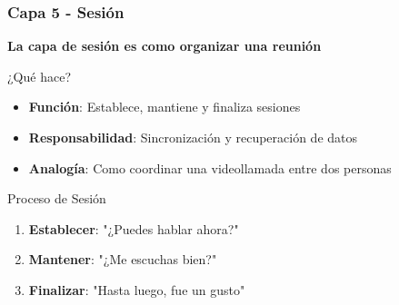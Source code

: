 \documentclass[aspectratio=169]{beamer}
\begin{document}
            \begin{frame}
            \frametitle{Capa 5 - Sesión}
            
            \begin{center}
            \Large \textbf{La capa de sesión es como organizar una reunión}
            \end{center}
        
            \begin{block}{¿Qué hace?}
            \begin{itemize}
            \item \textbf{Función}: Establece, mantiene y finaliza sesiones
            \item \textbf{Responsabilidad}: Sincronización y recuperación de datos
            \item \textbf{Analogía}: Como coordinar una videollamada entre dos personas
            \end{itemize}
            \end{block}
            
            \begin{block}{Proceso de Sesión}
            \begin{enumerate}
            \item \textbf{Establecer}: "¿Puedes hablar ahora?"
            \item \textbf{Mantener}: "¿Me escuchas bien?"
            \item \textbf{Finalizar}: "Hasta luego, fue un gusto"
            \end{enumerate}
            \end{block}
            
          
            \end{frame}
\end{document}
